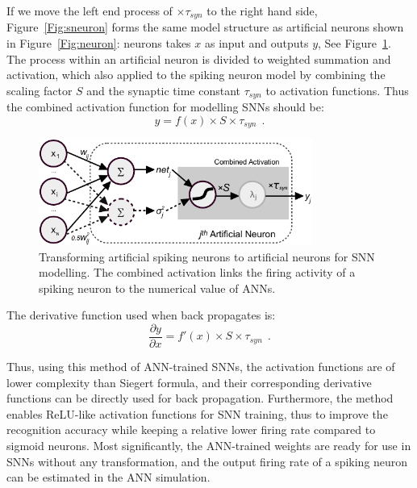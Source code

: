 	If we move the left end process of $\times \tau_{syn}$ to the right hand side, Figure~\ref{Fig:sneuron} forms the same model structure as artificial neurons shown in Figure~\ref{Fig:neuron}: neurons takes $x$ as input and outputs $y$, See Figure~\ref{Fig:tneuron}.
	The process within an artificial neuron is divided to weighted summation and activation, which also applied to the spiking neuron model by combining the scaling factor $S$ and the synaptic time constant $\tau_{syn}$ to activation functions.
	Thus the combined activation function for modelling SNNs should be:
	\begin{equation}
	y = f(x) \times S \times \tau_{syn}~~.
	\label{equ:full_act}
	\end{equation}
	\begin{figure}[tbh!]
		\centering
		\includegraphics[width=0.8\textwidth]{pics_iconip/neuron_t.pdf}
		\caption{Transforming artificial spiking neurons to artificial neurons for SNN modelling. The combined activation links the firing activity of a spiking neuron to the numerical value of ANNs.}
		\label{Fig:tneuron}
	\end{figure}
	
	
	
	The derivative function used when back propagates is:
	\begin{equation}
	\frac{\partial y}{\partial x} = f'(x) \times S \times \tau_{syn}~~.
	\end{equation}
	

	
	Thus, using this method of ANN-trained SNNs, the activation functions are of lower complexity than Siegert formula, and their corresponding derivative functions can be directly used for back propagation.
	Furthermore, the method enables ReLU-like activation functions for SNN training, thus to improve the recognition accuracy while keeping a relative lower firing rate compared to sigmoid neurons. 
	Most significantly, the ANN-trained weights are ready for use in SNNs without any transformation, and the output firing rate of a spiking neuron can be estimated in the ANN simulation.
	
